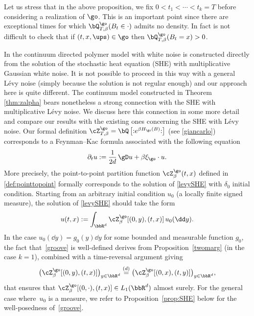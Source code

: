 \begin{rem}
Let us stress that in the above proposition,
we fix \hbox{$0\!<\!t_1\!<\!\cdots\!<\!t_k\!=\!T$}
before considering a realization of $\go$.
This is an important point since there are exceptional times for which $\bQ^{\go}_{T,\beta}(B_{t}\in \cdot)$
admits no density. In fact is not difficult to check that if $(t,x,\ups)\in \go$ then
$\bQ^{\go}_{T,\beta}(B_{t}=x)>0$.
\end{rem}

\label{sec:SHE}

In \cite{AKQ14b} the continuum directed polymer model with white noise is constructed direct\-ly from the solution of the stochastic heat equation (SHE) with multiplicative Gaussian white noise. It is not possible to proceed in this way with a general Lévy noise (simply because the solution is not regular enough) and our approach here is quite different.
The continuum model constructed in Theorem \ref{thm:zalpha} bears nonetheless a strong connection
with the SHE with multiplicative Lévy noise. We discuss here this connection in some more detail and compare our results with the existing ones concerning the SHE with Lévy noise.
Our formal definition $\cZ^{\go}_{T,\beta} = \bQ\left[ \mathbf{:}e^{\beta H_\go(B)}\mathbf{:} \right]$ (see \eqref{giancarlo}) corresponds to a Feynman--Kac formula associated with the following equation
\begin{equation}\label{levySHE}
\partial_t u:= \frac{1}{2d}\, \gD u + \beta \xi_{\go} \cdot u.
\end{equation}
More precisely, the point-to-point partition function $\cZ^{\go}_{\beta}(t,x)$ defined in \eqref{def:pointtopoint}
formally corresponds to the solution of \eqref{levySHE} with
$\delta_0$ initial condition.
Starting from an arbitrary initial condition $u_0$ (a locally finite signed measure), the solution of \eqref{levySHE} should take
the form
\begin{equation}\label{groove}
u(t,x):= \int_{\bbR^d} \cZ^{\go}_{\beta}[(0,y),(t,x)] \, u_0(\dd y).
\end{equation}
In the case $u_0(\dd y) = g_0(y) \dd y$ for some bounded and measurable function $g_0$,
the fact that~\eqref{groove}
is well-defined
derives from Proposition~\ref{twomarg} (in the case $k=1$), combined
with a time-reversal argument giving
\[
\bigl(\cZ^{\go}_{\beta}[(0,y),(t,x)] \bigr)_{y \in \bbR^d}\stackrel{(d)}{=} \bigl(\cZ^{\go}_{\beta}[(0,x),(t,y)]\bigr)_{y \in \bbR^d},
\]
that ensures that $\cZ^{\go}_{\beta}[(0,\cdot),(t,x)]\in L_1(\bbR^d)$
almost surely.
For the general case where~$u_0$ is a measure,
we refer to Proposition~\ref{prop:SHE} below
for the well-posedness of~\eqref{groove}.

